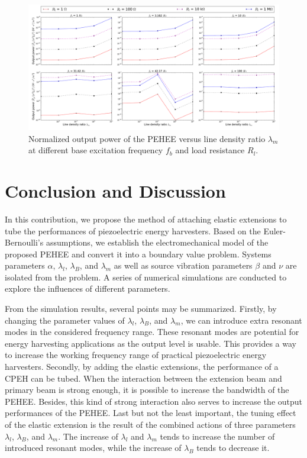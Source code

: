 \documentclass{elsarticle}
\begin{document}
\begin{figure}[!htbp]
    \centering
    \includegraphics[width=\textwidth]{./fig_pow_fr_sl_Rl_sl_vs_lamm}
    \caption{ Normalized output power of the PEHEE versus line density ratio $\lambda_m$ at different base excitation frequency $f_b$ and load resistance $R_l$. }
    \label{fig:fig_pow_fr_sl_Rl_sl_vs_lamm}
\end{figure}


\section{Conclusion and Discussion}

In this contribution, we propose the method of attaching elastic extensions to tube the performances of piezoelectric energy harvesters. Based on the Euler-Bernoulli's assumptions, we establish the electromechanical model of the proposed PEHEE and convert it into a boundary value problem. Systems parameters $\alpha$, $\lambda_l$, $\lambda_B$, and $\lambda_m$ as well as source vibration parameters $\beta$ and $\nu$ are isolated from the problem. A series of numerical simulations are conducted to explore the influences of different parameters. 

From the simulation results, several points may be summarized. Firstly, by changing the parameter values of $\lambda_l$, $\lambda_B$, and $\lambda_m$, we can introduce extra resonant modes in the considered frequency range. These resonant modes are potential for energy harvesting applications as the output level is usable. This provides a way to increase the working frequency range of practical piezoelectric energy harvesters. Secondly, by adding the elastic extensions, the performance of a CPEH can be tubed. When the interaction between the extension beam and primary beam is strong enough, it is possible to increase the bandwidth of the PEHEE. Besides, this kind of strong interaction also serves to increase the output performances of the PEHEE. Last but not the least important, the tuning effect of the elastic extension is the result of the combined actions of three parameters $\lambda_l$, $\lambda_B$, and $\lambda_m$. The increase of $\lambda_l$ and $\lambda_m$ tends to increase the number of introduced resonant modes, while the increase of $\lambda_B$ tends to decrease it.
\end{document}
